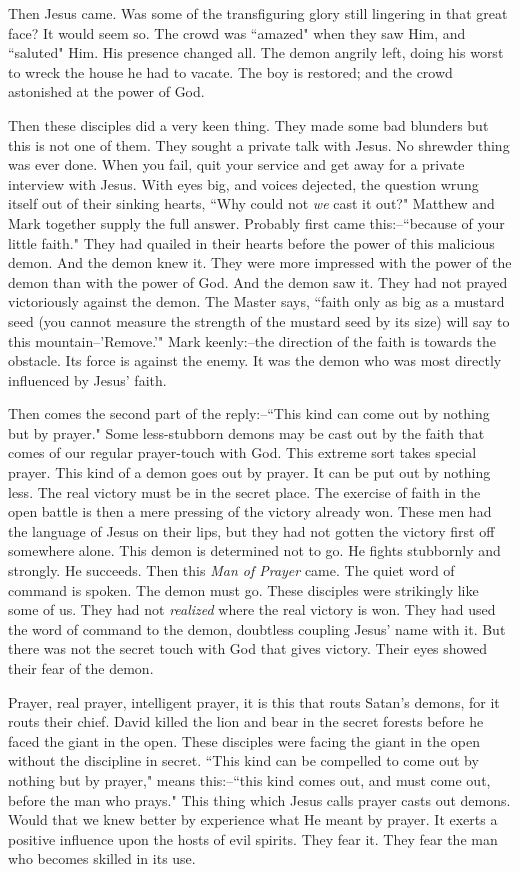 Then Jesus came. Was some of the transfiguring glory still lingering in
that great face? It would seem so. The crowd was ``amazed" when they saw
Him, and ``saluted" Him. His presence changed all. The demon angrily left,
doing his worst to wreck the house he had to vacate. The boy is restored;
and the crowd astonished at the power of God.

Then these disciples did a very keen thing. They made some bad blunders
but this is not one of them. They sought a private talk with Jesus. No
shrewder thing was ever done. When you fail, quit your service and get
away for a private interview with Jesus. With eyes big, and voices
dejected, the question wrung itself out of their sinking hearts, ``Why
could not \textit{we} cast it out?" Matthew and Mark together supply the full
answer. Probably first came this:--``because of your little faith." They
had quailed in their hearts before the power of this malicious demon. And
the demon knew it. They were more impressed with the power of the demon
than with the power of God. And the demon saw it. They had not prayed
victoriously against the demon. The Master says, ``faith only as big as a
mustard seed (you cannot measure the strength of the mustard seed by its
size) will say to this mountain--'Remove.'" Mark keenly:--the direction of
the faith is towards the obstacle. Its force is against the enemy. It was
the demon who was most directly influenced by Jesus' faith.

Then comes the second part of the reply:--``This kind can come out by
nothing but by prayer." Some less-stubborn demons may be cast out by the
faith that comes of our regular prayer-touch with God. This extreme sort
takes special prayer. This kind of a demon goes out by prayer. It can be
put out by nothing less. The real victory must be in the secret place. The
exercise of faith in the open battle is then a mere pressing of the
victory already won. These men had the language of Jesus on their lips,
but they had not gotten the victory first off somewhere alone. This demon
is determined not to go. He fights stubbornly and strongly. He succeeds.
Then this \textit{Man of Prayer} came. The quiet word of command is spoken. The
demon must go. These disciples were strikingly like some of us. They had
not \textit{realized} where the real victory is won. They had used the word of
command to the demon, doubtless coupling Jesus' name with it. But there
was not the secret touch with God that gives victory. Their eyes showed
their fear of the demon.

Prayer, real prayer, intelligent prayer, it is this that routs Satan's
demons, for it routs their chief. David killed the lion and bear in the
secret forests before he faced the giant in the open. These disciples were
facing the giant in the open without the discipline in secret. ``This kind
can be compelled to come out by nothing but by prayer," means this:--``this
kind comes out, and must come out, before the man who prays." This thing
which Jesus calls prayer casts out demons. Would that we knew better by
experience what He meant by prayer. It exerts a positive influence upon
the hosts of evil spirits. They fear it. They fear the man who becomes
skilled in its use.

